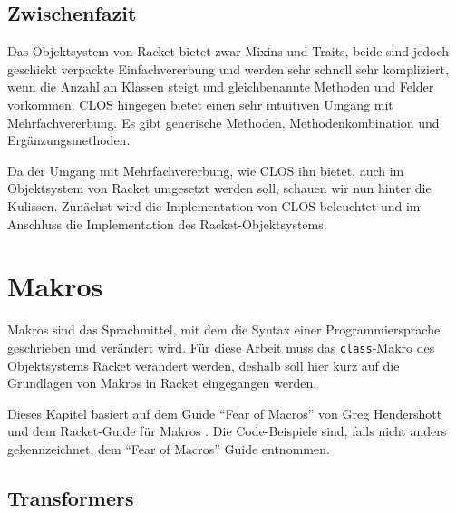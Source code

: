 
\pagestyle{diplHeadings}





\setcounter{page}{1}
\tableofcontents
\cleardoublepage 

\setcounter{page}{1} 
\mainmatter  
{}

 

 


\section{Zwischenfazit}
Das Objektsystem von Racket bietet zwar Mixins und Traits, beide sind jedoch geschickt verpackte Einfachvererbung und werden sehr schnell sehr kompliziert, wenn die Anzahl an Klassen steigt und gleichbenannte Methoden und Felder vorkommen. CLOS hingegen bietet einen sehr intuitiven Umgang mit Mehrfachvererbung. Es gibt generische Methoden, Methodenkombination und Ergänzungsmethoden.

Da der Umgang mit Mehrfachvererbung, wie CLOS ihn bietet, auch im Objektsystem von Racket umgesetzt werden soll, schauen wir nun hinter die Kulissen. Zunächst wird die Implementation von CLOS beleuchtet und im Anschluss die Implementation des Racket-Objektsystems.




\chapter{Makros} 
\label{makros}
Makros sind das Sprachmittel, mit dem die Syntax einer Programmiersprache geschrieben und verändert wird. Für diese Arbeit muss das \texttt{class}-Makro des Objektsystems Racket verändert werden, deshalb soll hier kurz auf die Grundlagen von Makros in Racket eingegangen werden.

Dieses Kapitel basiert auf dem Guide ``Fear of Macros'' von Greg Hendershott \cite{fearofmacros} und dem Racket-Guide für Makros \cite{racketguide-macros}. Die Code-Beispiele sind, falls nicht anders gekennzeichnet, dem ``Fear of Macros'' Guide entnommen.


\section{Transformers}
